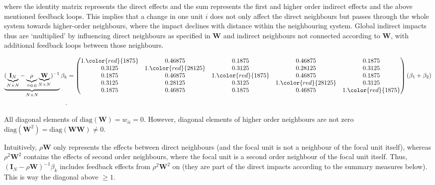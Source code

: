 \documentclass[
  letterpaper,
]{scrbook}
\begin{document}
where the identity matrix represents the direct effects and the sum
represents the first and higher order indirect effects and the above
mentioned feedback loops. This implies that a change in one unit \(i\)
does not only affect the direct neighbours but passes through the whole
system towards higher-order neighbours, where the impact declines with
distance within the neighbouring system. Global indirect impacts thus
are `multiplied' by influencing direct neighbours as specified in
\(\boldsymbol{\mathbf{W}}\) and indirect neighbours not connected
according to \(\boldsymbol{\mathbf{W}}\), with additional feedback loops
between those neighbours.

\[
\begin{split}
\underbrace{(\underbrace{\boldsymbol{\mathbf{I}}_N}_{N \times N} - \underbrace{\rho}_{\hat{=} 0.6} \underbrace{\boldsymbol{\mathbf{W}}}_{N \times N})^{-1}}_{N \times N} \beta_k
&=
\begin{pmatrix}
      1.\color{red}{1875} & 0.46875 & 0.1875 & 0.46875 & 0.1875 \\
      0.3125 & 1.\color{red}{28125} & 0.3125 & 0.28125 & 0.3125 \\
      0.1875 & 0.46875 & 1.\color{red}{1875} & 0.46875 & 0.1875 \\
      0.3125 & 0.28125 & 0.3125 & 1.\color{red}{28125} & 0.3125 \\
      0.1875 & 0.46875 & 0.1875 & 0.46875 & 1.\color{red}{1875}
      \end{pmatrix}
  \begin{matrix}
      (\beta_1 + \beta_2)\\
  \end{matrix}\\.
\end{split}
\]

All diagonal elements of
\(\mathrm{diag}({\boldsymbol{\mathbf{W}}})=w_{ii}=0\). However, diagonal
elements of higher order neighbours are not zero
\(\mathrm{diag}({\boldsymbol{\mathbf{W}}}^2)=\mathrm{diag}({\boldsymbol{\mathbf{W}}}{\boldsymbol{\mathbf{W}}})\neq0\).

Intuitively, \(\rho{\boldsymbol{\mathbf{W}}}\) only represents the
effects between direct neighbours (and the focal unit is not a neighbour
of the focal unit itself), whereas \(\rho^2{\boldsymbol{\mathbf{W}}}^2\)
contains the effects of second order neighbours, where the focal unit is
a second order neighbour of the focal unit itself. Thus,
\(({\boldsymbol{\mathbf{I}}_N}-\rho {\boldsymbol{\mathbf{W}}})^{-1}\beta_k\)
includes {feedback effects} from \(\rho^2{\boldsymbol{\mathbf{W}}}^2\)
on (they are part of the direct impacts according to the summary
measures below). This is way the {diagonal above} \(\geq 1\).
\end{document}
